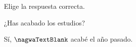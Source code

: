 
\begin{question}

\begin{instance}
  
\begin{mcq}[standalone=false]
    
\begin{stem}
      Elige la respuesta correcta.\par      
\begin{enumerationnolabel}
        \item{¿Has acabado los estudios?}        \item{Sí, $ \nagwaTextBlank$ acabé el año pasado.}      
\end{enumerationnolabel}
          
\end{stem}
    
\begin{distractors}
\end{distractors}
              
\end{mcq}

\end{instance}

\end{question}
